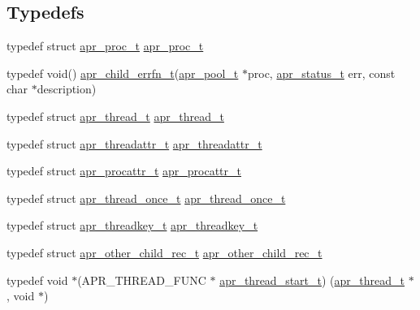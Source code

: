 \subsection*{Typedefs}
\begin{DoxyCompactItemize}
\item 
typedef struct \mbox{\hyperlink{structapr__proc__t}{apr\+\_\+proc\+\_\+t}} \mbox{\hyperlink{group__apr__thread__proc_gada60ec0f833048291d98e66f21f4c4c4}{apr\+\_\+proc\+\_\+t}}
\item 
typedef void() \mbox{\hyperlink{group__apr__thread__proc_ga1feae4cf7ed6f156a0db10172e228e2d}{apr\+\_\+child\+\_\+errfn\+\_\+t}}(\mbox{\hyperlink{group__apr__pools_gaf137f28edcf9a086cd6bc36c20d7cdfb}{apr\+\_\+pool\+\_\+t}} $\ast$proc, \mbox{\hyperlink{group__apr__errno_gaf76ee4543247e9fb3f3546203e590a6c}{apr\+\_\+status\+\_\+t}} err, const char $\ast$description)
\item 
typedef struct \mbox{\hyperlink{structapr__thread__t}{apr\+\_\+thread\+\_\+t}} \mbox{\hyperlink{group__apr__thread__proc_ga646c71351e723d84f8cc8c8d1d5937be}{apr\+\_\+thread\+\_\+t}}
\item 
typedef struct \mbox{\hyperlink{structapr__threadattr__t}{apr\+\_\+threadattr\+\_\+t}} \mbox{\hyperlink{group__apr__thread__proc_ga35de571e9944871c10b38d8feef885ac}{apr\+\_\+threadattr\+\_\+t}}
\item 
typedef struct \mbox{\hyperlink{structapr__procattr__t}{apr\+\_\+procattr\+\_\+t}} \mbox{\hyperlink{group__apr__thread__proc_ga0d83919a6a0dd609598a864917f8b339}{apr\+\_\+procattr\+\_\+t}}
\item 
typedef struct \mbox{\hyperlink{structapr__thread__once__t}{apr\+\_\+thread\+\_\+once\+\_\+t}} \mbox{\hyperlink{group__apr__thread__proc_ga91841bcf20d0579e8e6acc6d3c220ac1}{apr\+\_\+thread\+\_\+once\+\_\+t}}
\item 
typedef struct \mbox{\hyperlink{structapr__threadkey__t}{apr\+\_\+threadkey\+\_\+t}} \mbox{\hyperlink{group__apr__thread__proc_ga337c9c1bd2d47740022071a5c41f2edb}{apr\+\_\+threadkey\+\_\+t}}
\item 
typedef struct \mbox{\hyperlink{structapr__other__child__rec__t}{apr\+\_\+other\+\_\+child\+\_\+rec\+\_\+t}} \mbox{\hyperlink{group__apr__thread__proc_gafc52ee8b19a7b222278d31ebb3f11a71}{apr\+\_\+other\+\_\+child\+\_\+rec\+\_\+t}}
\item 
typedef void $\ast$(A\+P\+R\+\_\+\+T\+H\+R\+E\+A\+D\+\_\+\+F\+U\+NC $\ast$ \mbox{\hyperlink{group__apr__thread__proc_gaa1f88d2a6fe971ac200e466cae5f63e0}{apr\+\_\+thread\+\_\+start\+\_\+t}}) (\mbox{\hyperlink{structapr__thread__t}{apr\+\_\+thread\+\_\+t}} $\ast$, void $\ast$)
\end{DoxyCompactItemize}
